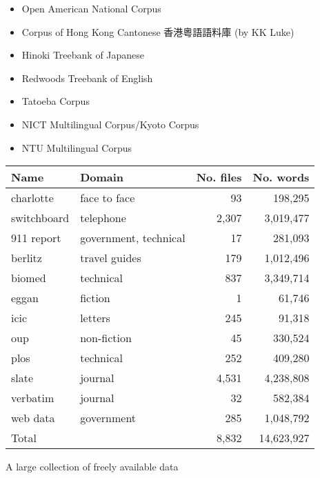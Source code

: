 \documentclass[a4paper,landscape,headrule,footrule,dvips]{foils}
\begin{document}
\begin{CJK}{UTF8}{min}

\begin{itemize}
\item Open American National Corpus
\item Corpus of Hong Kong Cantonese 香港粵語語料庫 (by KK Luke)
\item Hinoki Treebank of Japanese
\item Redwoods Treebank of English
\item Tatoeba Corpus
\item NICT Multilingual Corpus/Kyoto Corpus
\item NTU Multilingual Corpus
\end{itemize}


\begin{tabular}{llrr}
Name & Domain & No. files & No. words \\
\hline
charlotte & 	face to face 	& 93 &198,295 \\
switchboard & 	telephone	& 2,307 &3,019,477 \\
\hline
911  report & 	government, technical 	& 17  &	 281,093 \\
berlitz & 	travel guides 	& 179 &1,012,496 \\
biomed & 	technical	& 837 &3,349,714 \\
eggan & 	fiction 	& 1 &61,746 \\
icic & 	letters	& 245 &91,318 \\
oup & 	non-fiction	& 45 &330,524 \\
plos & 	technical	& 252 &409,280 \\
slate & 	journal	& 4,531 &4,238,808 \\
verbatim & 	journal	& 32 &582,384 \\
web  data &	government	& 285 &1,048,792 \\
\hline
Total& & 8,832 & 	14,623,927\\
\end{tabular}

A large collection of freely available data



\end{CJK}
\end{document}
